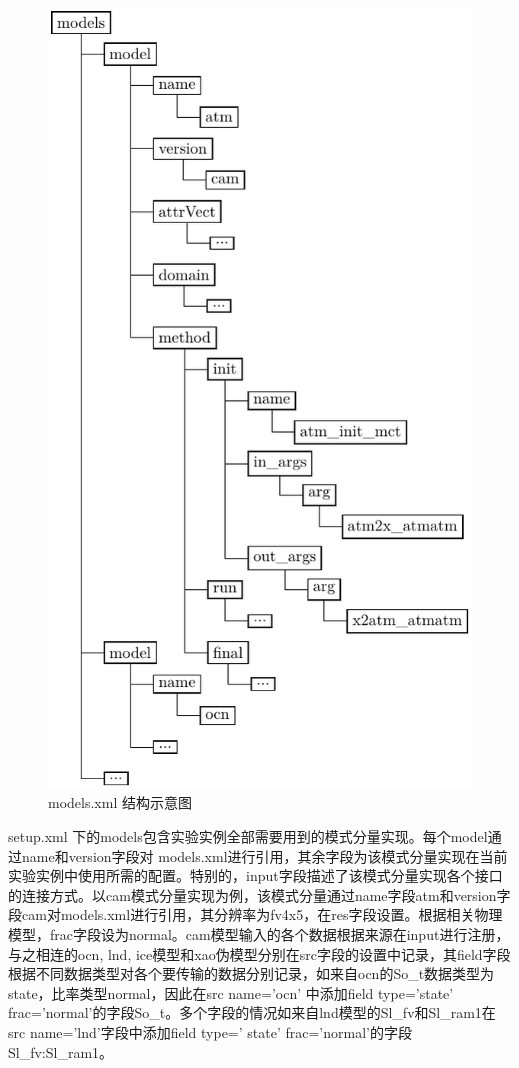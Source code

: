 \begin{figure}[H]
\centering
\includegraphics{../figures/models.pdf}
\caption{models.xml 结构示意图}
\end{figure}

setup.xml 下的models包含实验实例全部需要用到的模式分量实现。每个model通过name和version字段对 models.xml进行引用，其余字段为该模式分量实现在当前实验实例中使用所需的配置。特别的，input字段描述了该模式分量实现各个接口的连接方式。以cam模式分量实现为例，该模式分量通过name字段atm和version字段cam对models.xml进行引用，其分辨率为fv4x5，在res字段设置。根据相关物理模型，frac字段设为normal。cam模型输入的各个数据根据来源在input进行注册，与之相连的ocn, lnd, ice模型和xao伪模型分别在src字段的设置中记录，其field字段根据不同数据类型对各个要传输的数据分别记录，如来自ocn的So\_t数据类型为state，比率类型normal，因此在src name='ocn' 中添加field type='state' frac='normal'的字段So\_t。多个字段的情况如来自lnd模型的Sl\_fv和Sl\_ram1在src name='lnd'字段中添加field type='
state' frac='normal'的字段Sl\_fv:Sl\_ram1。


